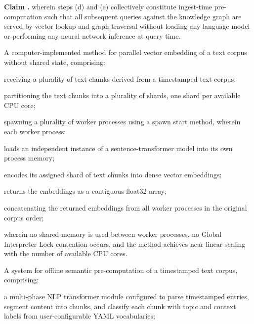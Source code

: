 \documentclass[12pt,letterpaper]{article}
\newcounter{claimnum}
\newenvironment{claims}
  {\begin{list}{\textbf{Claim \arabic{claimnum}.}}
      {\usecounter{claimnum}
       \setlength{\labelwidth}{1.8cm}
       \setlength{\labelsep}{0.4cm}
       \setlength{\leftmargin}{2.2cm}
       \setlength{\itemsep}{12pt}
       \setlength{\parsep}{4pt}}}
  {\end{list}}
\begin{document}
\begin{claims}
\noindent wherein steps (d) and (e) collectively constitute ingest-time pre-computation
such that all subsequent queries against the knowledge graph are served by vector lookup
and graph traversal without loading any language model or performing any neural network
inference at query time.

\item A computer-implemented method for parallel vector embedding of a text corpus
without shared state, comprising:

\begin{claimelems}
  \item receiving a plurality of text chunks derived from a timestamped text corpus;

  \item partitioning the text chunks into a plurality of shards, one shard per
        available CPU core;

  \item spawning a plurality of worker processes using a spawn start method, wherein
        each worker process:
    \begin{claimelems}
      \item loads an independent instance of a sentence-transformer model into its own
            process memory;
      \item encodes its assigned shard of text chunks into dense vector embeddings;
      \item returns the embeddings as a contiguous float32 array;
    \end{claimelems}

  \item concatenating the returned embeddings from all worker processes in the original
        corpus order;
\end{claimelems}

\noindent wherein no shared memory is used between worker processes, no Global
Interpreter Lock contention occurs, and the method achieves near-linear scaling with
the number of available CPU cores.

\item A system for offline semantic pre-computation of a timestamped text corpus,
comprising:

\begin{claimelems}
  \item a multi-phase NLP transformer module configured to parse timestamped entries,
        segment content into chunks, and classify each chunk with topic and context
        labels from user-configurable YAML vocabularies;


\end{claimelems}
\end{claims}
\end{document}
